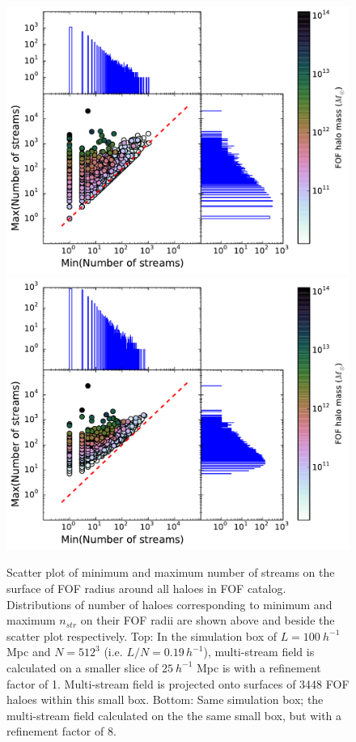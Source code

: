  \begin{figure}
\begin{minipage}[t]{.99\linewidth}
  \centering\includegraphics[width=10.cm]{Chapter3/Source_v2/fig12a}
\includegraphics[width=10.cm]{Chapter3/Source_v2/fig12b} 
\end{minipage}\hfill
\caption{Scatter plot of minimum and maximum number of streams on the surface of FOF radius around all haloes in FOF catalog. Distributions of number of haloes corresponding to minimum and maximum $n_{str}$ on their FOF radii are shown above and beside the scatter plot respectively. Top: In the simulation box of $L =100 ~h^{-1}$ Mpc and $N = 512^3$ (i.e. $L/N = 0.19 \,h^{-1}$), multi-stream field is calculated on a smaller slice of $ 25 ~h^{-1}$ Mpc is  with a refinement factor of 1. Multi-stream field is projected onto surfaces of 3448 FOF haloes within this small box. Bottom: Same simulation box; the multi-stream field calculated on the the same small box, but with a refinement factor of 8.}
\label{fig:minmax512}
\end{figure}

